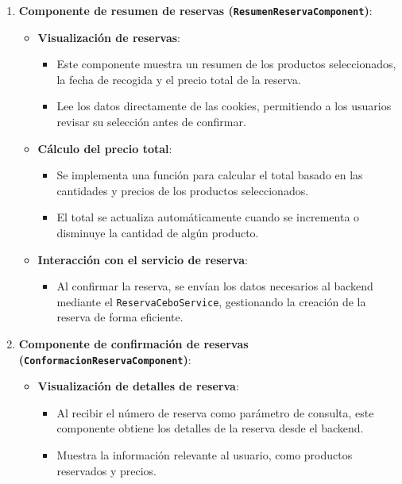 \begin{itemize}
\begin{enumerate}
    \item \textbf{Componente de resumen de reservas (\texttt{ResumenReservaComponent})}:
    \begin{itemize}
        \item \textbf{Visualización de reservas}:
        \begin{itemize}
            \item Este componente muestra un resumen de los productos seleccionados, la fecha de recogida y el precio total de la reserva.
            \item Lee los datos directamente de las cookies, permitiendo a los usuarios revisar su selección antes de confirmar.
        \end{itemize}
        
        \item \textbf{Cálculo del precio total}:
        \begin{itemize}
            \item Se implementa una función para calcular el total basado en las cantidades y precios de los productos seleccionados.
            \item El total se actualiza automáticamente cuando se incrementa o disminuye la cantidad de algún producto.
        \end{itemize}
        
        \item \textbf{Interacción con el servicio de reserva}:
        \begin{itemize}
            \item Al confirmar la reserva, se envían los datos necesarios al backend mediante el \texttt{ReservaCeboService}, gestionando la creación de la reserva de forma eficiente.
        \end{itemize}
    \end{itemize}

    \item \textbf{Componente de confirmación de reservas (\texttt{ConformacionReservaComponent})}:
    \begin{itemize}
        \item \textbf{Visualización de detalles de reserva}:
        \begin{itemize}
            \item Al recibir el número de reserva como parámetro de consulta, este componente obtiene los detalles de la reserva desde el backend.
            \item Muestra la información relevante al usuario, como productos reservados y precios.
        \end{itemize}
    \end{itemize}


\end{enumerate}
\end{itemize}
